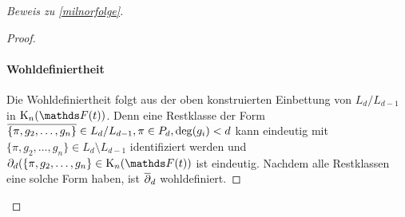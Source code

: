 \documentclass[ngerman,fontsize=11pt, paper=a4, parskip=half, titlepage=true, toc=bib]{scrartcl}
\begin{document}
\begin{proof}[Beweis zu \ref{milnorfolge}]
\begin{proof}
    \paragraph{Wohldefiniertheit}

    Die Wohldefiniertheit folgt aus der oben konstruierten Einbettung
    von $L_d/L_{d-1}$ in $\KnFt$. Denn eine Restklasse der Form
    $\overline{\{\pi,g_2,\dotsc,g_n\}}\in L_d/L_{d-1},\pi\in P_d,\deg(g_i)<d$ 
    kann eindeutig mit $\{\pi,g_2,\dotsc,g_n\}\in L_d\setminus
    L_{d-1}$ identifiziert
    werden und $\partial_d(\{\pi,g_2,\dotsc,g_n\}\in\KnFt$ ist
    eindeutig. Nachdem alle Restklassen eine solche Form haben,
    ist $\overline{\partial}_d$ wohldefiniert.


\end{proof}
\end{proof}
\end{document}
